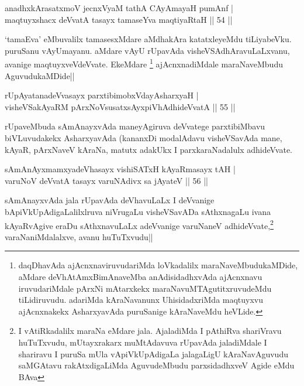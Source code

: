 \begin{shl}
anadhxkArasatxmoV jecnxVyaM tathA CAyAmayaH pumAnf |\\
maqtuyxshacx deVvatA tasayx tamaseYva maqtiyaRtaH \hfill || 54 ||
\end{shl}

\begin{artha}%
`tamaEva' eMbuvalilx tamasesxMdare aMdhakAra katatxleyeMdu tiLiyabeVku. puruSanu vAyUmayanu. aMdare vAyU rUpavAda visheVSAdhAravuLaLxvanu, avanige maqtuyxveVdeVvate. EkeMdare \footnote[1]{daqDhavAda ajAcnxnaviruvudariMda loVkadalilx maraNaveMbudukaMDide, aMdare deVhAtAmxBimAnaveMba anAdisidadhxvAda ajAcnxnavu iruvudariMdale pArxNi mAtarxkekx maraNavuMTAgutitxruvudeMdu tiLidiruvudu. adariMda kAraNavanunx UhisidadxriMda maqtuyxvu ajAcnxnakekx AsharxyavAda puruSanige kAraNaveMdu heVLide.} ajAcnxnadiMdale maraNaveMbudu AguvudukaMDide||
\end{artha}


\begin{shl}
rUpAyatanadeVvasayx parxtibimobxVdayAsharxyaH |\\
visheVSakAyaRM pArxNoV\s susatxsAyxpiVhAdhideVvatA \hfill || 55 ||
\end{shl}

\begin{artha}
rUpaveMbuda sAmAnayxvAda maneyAgiruva deVvatege parxtibiMbavu biVLuvudakekx AsharxyavAda (kananxDi modalAdavu visheVSavAda mane, kAyaR, pArxNaveV kAraNa, matutx adakUkx I parxkaraNadalulx adhideVvate.
\end{artha}


\begin{shl}
sAmAnAyxmamxyadeVhasayx vishiSATxH kAyaRmasayx tAH |\\
varuNoV deVvatA tasayx varuNAdivx sa jAyateV \hfill || 56 ||
\end{shl}

\begin{artha}
sAmAnayxvAda jala rUpavAda deVhavuLaLx I deVvanige bApiVkUpAdigaLalilxlruva  niVrugaLu visheVSavADa sAthxnagaLu ivana kAyaRvAgive eraDu sAthxnavuLaLx adeVvanige varuNaneV adhideVvate,\footnote[2]{I vAtiRkadalilx maraNa eMdare jala. AjaladiMda I pAthiRva shariVravu huTuTxvudu, mUtayxrakarx muMtAdavuva rUpavAda jaladiMdale I shariravu I puruSa mUla vApiVkUpAdigaLa jalagaLigU kAraNavAguvudu saMGAtavu rakAtxdigaLiMda AguvudeMbudu parxsidadhxveV Agide eMdu BAva} varaNaniMdalalxve, avanu huTuTxvudu||
\end{artha}

